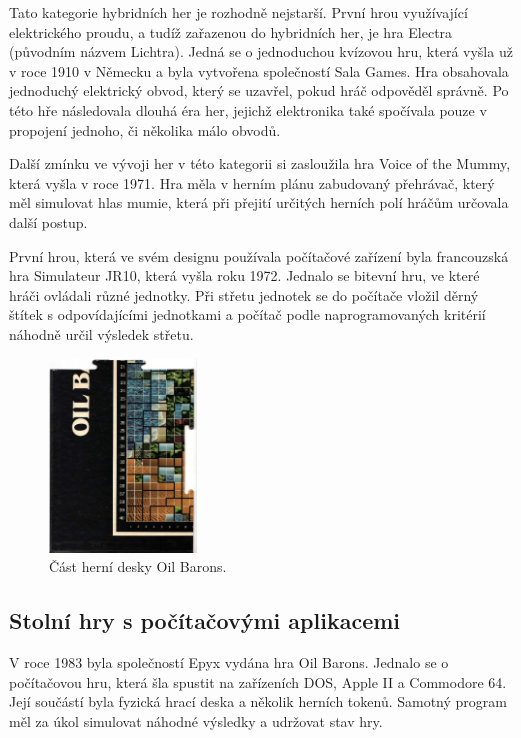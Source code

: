 Tato kategorie hybridních her je rozhodně nejstarší. První hrou využívající elektrického proudu, a tudíž zařazenou do hybridních her, je hra Electra (původním názvem Lichtra). Jedná se o jednoduchou kvízovou hru, která vyšla už v roce 1910 v Německu a byla vytvořena společností Sala Games. Hra obsahovala jednoduchý elektrický obvod, který se uzavřel, pokud hráč odpověděl správně. Po této hře následovala dlouhá éra her, jejichž elektronika také spočívala pouze v propojení jednoho, či několika málo obvodů.\cite{history_of_hybrid_games, boardgames_with_apps}

Další zmínku ve vývoji her v této kategorii si zasloužila hra Voice of the Mummy, která vyšla v roce 1971. Hra měla v herním plánu zabudovaný přehrávač, který měl simulovat hlas mumie, která při přejití určitých herních polí hráčům určovala další postup.\cite{voice_of_the_mummy}

První hrou, která ve svém designu používala počítačové zařízení byla francouzská hra Simulateur JR10, která vyšla roku 1972. Jednalo se bitevní hru, ve které hráči ovládali různé jednotky. Při střetu jednotek se do počítače vložil děrný štítek s odpovídajícími jednotkami a počítač podle naprogramovaných kritérií náhodně určil výsledek střetu.\cite{simulateur_jr10}

\begin{figure}
    \centering
    \includegraphics[width=0.35\textwidth]{resources/figures/oil_barons.jpg}
    \caption{Část herní desky Oil Barons.\cite{oil_barons}}
    \label{fig:oil_barons}
\end{figure}

\subsection{Stolní hry s počítačovými aplikacemi}
V roce 1983 byla společností Epyx vydána hra Oil Barons. Jednalo se o počítačovou hru, která šla spustit na zařízeních DOS, Apple II a Commodore 64. Její součástí byla fyzická hrací deska a několik herních tokenů. Samotný program měl za úkol simulovat náhodné výsledky a udržovat stav hry.\cite{oil_barons}

